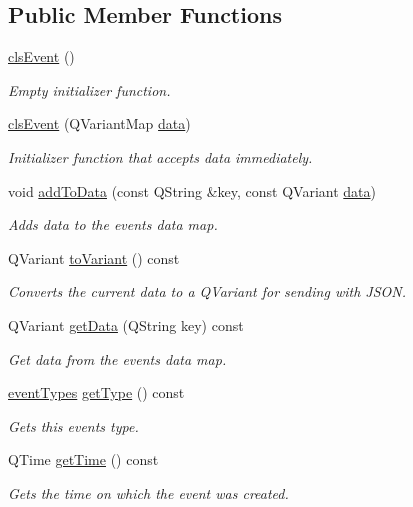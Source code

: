 \subsection*{Public Member Functions}
\begin{DoxyCompactItemize}
\item 
\hyperlink{classshared_1_1events_1_1cls_event_a365cd41df39086701ec250126da6e026}{cls\-Event} ()
\begin{DoxyCompactList}\small\item\em Empty initializer function. \end{DoxyCompactList}\item 
\hyperlink{classshared_1_1events_1_1cls_event_a192623e78217baaf5b286790d809521b}{cls\-Event} (Q\-Variant\-Map \hyperlink{classshared_1_1events_1_1cls_event_a6cfb6b96d72fc1e7a101e61061ec2755}{data})
\begin{DoxyCompactList}\small\item\em Initializer function that accepts data immediately. \end{DoxyCompactList}\item 
void \hyperlink{classshared_1_1events_1_1cls_event_ae7cb0f0606ecf456e4005783a33f5851}{add\-To\-Data} (const Q\-String \&key, const Q\-Variant \hyperlink{classshared_1_1events_1_1cls_event_a6cfb6b96d72fc1e7a101e61061ec2755}{data})
\begin{DoxyCompactList}\small\item\em Adds data to the events data map. \end{DoxyCompactList}\item 
Q\-Variant \hyperlink{classshared_1_1events_1_1cls_event_a48d11c9b50a2569c1065f19ca87d0715}{to\-Variant} () const 
\begin{DoxyCompactList}\small\item\em Converts the current data to a Q\-Variant for sending with J\-S\-O\-N. \end{DoxyCompactList}\item 
Q\-Variant \hyperlink{classshared_1_1events_1_1cls_event_ac3acc2e80a92d28a980a50595517bf4a}{get\-Data} (Q\-String key) const 
\begin{DoxyCompactList}\small\item\em Get data from the events data map. \end{DoxyCompactList}\item 
\hyperlink{namespaceshared_1_1events_a758b1a88b2eb1c9ef9388755f8869ad7}{event\-Types} \hyperlink{classshared_1_1events_1_1cls_event_a33943d736db49d2a7781325357f34063}{get\-Type} () const 
\begin{DoxyCompactList}\small\item\em Gets this events type. \end{DoxyCompactList}\item 
Q\-Time \hyperlink{classshared_1_1events_1_1cls_event_a2b450c42e2a6603add85738c19ea7151}{get\-Time} () const 
\begin{DoxyCompactList}\small\item\em Gets the time on which the event was created. \end{DoxyCompactList}\end{DoxyCompactItemize}
